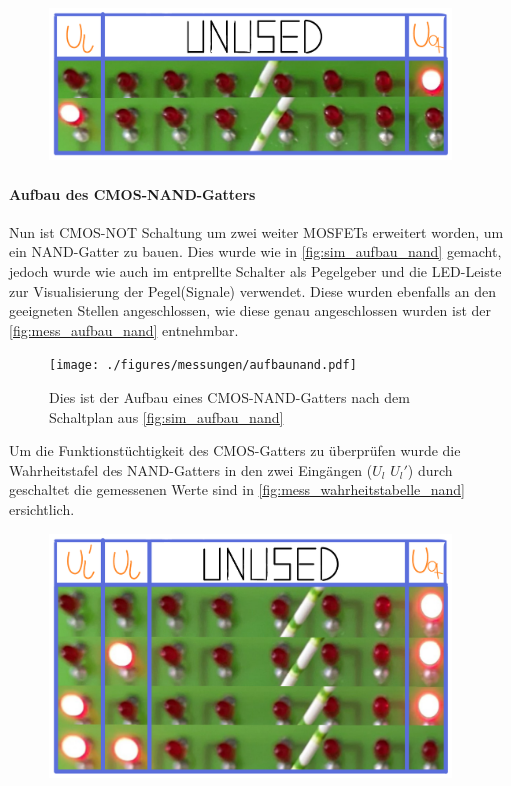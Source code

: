 \documentclass[12pt,english,ngerman]{scrartcl}
\begin{document}
\begin{figure}[H]
  \centering
    \includegraphics[width=0.95\textwidth]{./figures/messungen/WahrheitstabelleInverter.pdf}
  \caption{}
  \label{fig:mess_wahrheitstabelle_inv}
\end{figure}


\paragraph{Aufbau des CMOS-NAND-Gatters}
Nun ist CMOS-NOT Schaltung um zwei weiter MOSFETs erweitert worden, um ein
NAND-Gatter zu bauen. Dies wurde wie in \autoref{fig:sim_aufbau_nand} gemacht,
jedoch wurde wie auch im  entprellte Schalter als
Pegelgeber und die LED-Leiste zur Visualisierung der Pegel(Signale) verwendet.
Diese wurden ebenfalls an den geeigneten Stellen angeschlossen, wie diese genau
angeschlossen wurden ist der \autoref{fig:mess_aufbau_nand} entnehmbar.

\begin{figure}[H]
  \centering
    \texttt{[image: ./figures/messungen/aufbaunand.pdf]}
  \caption{Dies ist der Aufbau eines CMOS-NAND-Gatters nach dem Schaltplan aus \autoref{fig:sim_aufbau_nand}}
  \label{fig:mess_aufbau_nand}
\end{figure}

Um die Funktionstüchtigkeit des CMOS-Gatters zu überprüfen wurde die
Wahrheitstafel des NAND-Gatters in den zwei Eingängen ($U_l$ $U_l'$) durch
geschaltet die gemessenen Werte sind in \autoref{fig:mess_wahrheitstabelle_nand}
ersichtlich.


\begin{figure}[H]
  \centering
    \includegraphics[width=0.95\textwidth]{./figures/messungen/WahrheitstabelleNAND.pdf}
  \caption{}
  \label{fig:mess_wahrheitstabelle_nand}
\end{figure}
\end{document}
